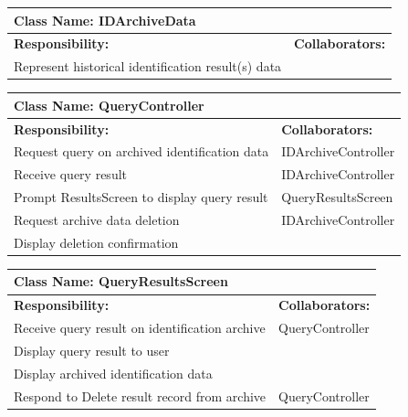 \documentclass[]{article}
\begin{document}
	\begin{table}[ht]
		\centering
		\begin{tabular}{|p{5cm}|p{5cm}|}
		\hline 
		 \multicolumn{2}{|l|}{\textbf{Class Name: IDArchiveData}} \\
		\hline
		\textbf{Responsibility:} & \textbf{Collaborators:} \\
		\hline
		Represent historical identification result(s) data &  \\
		\hline
		\end{tabular}
	\end{table}
	
	\begin{table}[ht]
		\centering
		\begin{tabular}{|p{5cm}|p{5cm}|}
		\hline 
		 \multicolumn{2}{|l|}{\textbf{Class Name: QueryController}} \\
		\hline
		\textbf{Responsibility:} & \textbf{Collaborators:} \\
		\hline
		Request query on archived identification data & IDArchiveController \\
		\hline
		Receive query result & IDArchiveController \\
		\hline
		Prompt ResultsScreen to display query result & QueryResultsScreen \\
		\hline
		Request archive data deletion & IDArchiveController \\
		\hline
		Display deletion confirmation &  \\
		\hline
		\end{tabular}
	\end{table}
	
\newpage
	\begin{table}[ht]
		\centering
		\begin{tabular}{|p{5cm}|p{5cm}|}
		\hline 
		 \multicolumn{2}{|l|}{\textbf{Class Name: QueryResultsScreen}} \\
		\hline
		\textbf{Responsibility:} & \textbf{Collaborators:} \\
		\hline
		Receive query result on identification archive & QueryController \\
		\hline
		Display query result to user &  \\
		\hline
		Display archived identification data &  \\
		\hline
		Respond to Delete result record from archive & QueryController \\
		\hline
		\end{tabular}
	\end{table}
	
\end{document}

